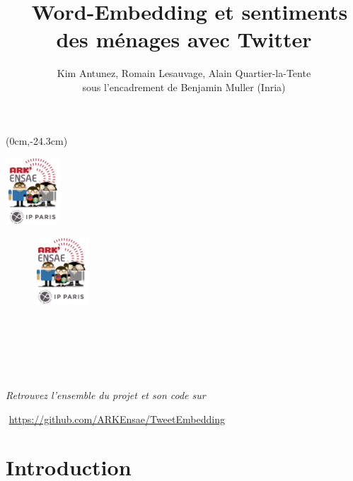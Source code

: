 \documentclass[11pt,french,french]{article}
\title{~Word-Embedding et sentiments des ménages avec Twitter}
\author{Kim Antunez, Romain Lesauvage, Alain Quartier-la-Tente\\
sous l'encadrement de Benjamin Muller (Inria)}
\date{}
\begin{document}
\maketitle


{
\hypersetup{linkcolor=black}
\setcounter{tocdepth}{2}
\tableofcontents
}
\begin{textblock*}{\textwidth}(0cm,-24.3cm)
\begin{center}
\includegraphics[height=2.5cm]{img/LOGO-ENSAE.png}
\end{center}
\end{textblock*}

\newpage 

\begin{center}
\begin{minipage}{0.7\textwidth}

\begin{figure}
\includegraphics[height=2.5cm]{img/LOGO-ENSAE.png}
\end{figure}

$\phantom{saut}$

$\phantom{saut}$

$\phantom{saut}$


\emph{Retrouvez l'ensemble du projet et son code sur}

$\phantom{}$%
\url{https://github.com/ARKEnsae/TweetEmbedding}

\end{minipage}
\end{center}

\vspace{0.5cm}

\section*{Introduction}\label{introduction}
\end{document}
